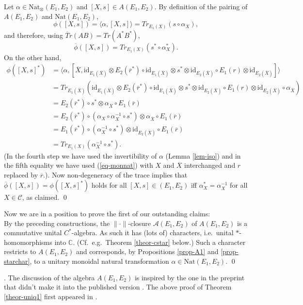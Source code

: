 \documentclass[11pt]{article}
\theoremstyle{definition}
\theoremstyle{definition}
\theoremstyle{remark}
\def\2#1{{\mathcal #1}}
\def\7#1{{\mathbb #1}}
\def\ol#1{{\overline #1}}
\newcommand{\mcirc}{\circ}
\def\id{\mathrm{id}}
\newcommand{\Nat}{\mathrm{Nat}}
\begin{document}
\prf Let $\alpha\in\Nat_\otimes(E_1,E_2)$ and $[X,s]\in A(E_1,E_2)$. By definition of the pairing of
$A(E_1,E_2)$ and $\Nat(E_1,E_2)$,
\[ \phi([X,s])=\langle\alpha,[X,s]\rangle=Tr_{E_1(X)}(s\circ\alpha_X), \]
and therefore, using $\ol{Tr(AB)}=Tr(A^*B^*)$,
\[ \ol{\phi([X,s])}=Tr_{E_1(X)}(s^*\circ\alpha_X^*). \]
On the other hand,
\begin{align*}
 \phi([X,s]^*) &=\langle\alpha,[\ol{X},\id_{E_1(\ol{X})} \otimes E_2(\ol{r}^*)\mcirc \id_{E_1(\ol{X})} 
   \otimes s^*\otimes\id_{E_2(\ol{X})}  \mcirc E_1(r)\otimes \id_{E_2(\ol{X})} ]\rangle \\
   &=Tr_{E_1(\ol{X})}(\id_{E_1(\ol{X})} \otimes E_2(\ol{r}^*)\mcirc \id_{E_1(\ol{X})} \otimes 
   s^*\otimes\id_{E_2(\ol{X})}  \mcirc E_1(r)\otimes \id_{E_2(\ol{X})} \mcirc\alpha_{\ol{X}} )  \\
   &= E_2(\ol{r}^*)\mcirc s^*\otimes \alpha_{\ol{X}}\mcirc E_1(\ol{r}) \\
   &= E_2(\ol{r}^*)\mcirc (\alpha_X\circ\alpha_X^{-1}\circ s^*)\otimes \alpha_{\ol{X}}\mcirc E_1(\ol{r}) \\
   &= E_1(\ol{r}^*)\mcirc (\alpha_X^{-1}\circ s^*)\otimes\id_{E_2(\ol{X})}\mcirc E_1(\ol{r}) \\
   &= Tr_{E_1(X)}(\alpha_X^{-1}\circ s^*).
\end{align*}
(In the fourth step we have used the invertibility of $\alpha$ (Lemma \ref{lem-iso}) and in the
fifth equality we have used (\ref{eq-monnat}) with $X$ and $\ol{X}$ interchanged and $r$ 
replaced by $\ol{r}$.). Now non-degeneracy of the trace implies that
$\ol{\phi([X,s])}=\phi([X,s]^*)$ holds for all $[X,s]\in (E_1,E_2)$ iff $\alpha_X^*=\alpha_X^{-1}$
for all $X\in\2C$, as claimed.  
\qed

Now we are in a position to prove the first of our outstanding claims: \\

  
By the preceding constructions, the $\|\cdot\|$-closure $\2A(E_1,E_2)$ of $A(E_1,E_2)$ is a
commutative unital $C^*$-algebra. As such it has (lots of) characters, i.e.\ unital
$*$-homomorphisms into $\7C$. (Cf.\ e.g.\ Theorem \ref{theor-cstar} below.) Such a character
restricts to $A(E_1,E_2)$ and corresponds, by Propositions \ref{prop-A1} and \ref{prop-starchar}, to
a unitary monoidal natural transformation $\alpha\in\Nat(E_1,E_2)$.  
\qed

. The discussion of the algebra $A(E_1,E_2)$ is inspired by the one in the preprint
\cite{bichon1} that didn't make it into the published version \cite{bichon}. The above proof of 
Theorem \ref {theor-uniq1} first appeared in \cite{bichon2}.
\end{document}
